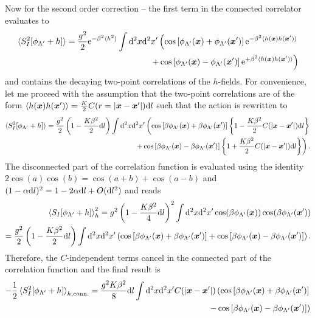 Now for the second order correction -- the first term in the connected correlator evaluates to
\begin{align}
    \braket{S^2_I[\phi_{\Lambda'}+h]}=\frac{g^2}2\mathrm e^{-\beta^2\braket{h^2}}\int\mathrm d^2x\mathrm d^2x'
    \left(
        \cos\left[ \phi_{\Lambda'}({\bm x})+\phi_{\Lambda'}({\bm x'}) \right]\mathrm e^{-\beta^2\braket{h({\bm x})h({\bm x'})}}
        \right.\\
        \left.+
        \cos\left[ \phi_{\Lambda'}({\bm x})-\phi_{\Lambda'}({\bm x'}) \right]\mathrm e^{+\beta^2\braket{h({\bm x})h({\bm x'})}}
    \right)
    \label{eq:second_order_rg_term1}
\end{align}
and contains the decaying two-point correlations of the $h$-fields.
For convenience, let me proceed with the assumption that the two-point correlations are of the form $\braket{h({\bm x})h({\bm x'})} = \frac K2 C(r=|{\bm x}-{\bm x'}|)\mathrm d l$ such that the action is rewritten to
{\small
\begin{align}
    \braket{S^2_I[\phi_{\Lambda'}+h]}=\frac{g^2}2\left( 1 - \frac{K\beta^2}2\mathrm d l \right)\int\mathrm d^2x\mathrm d^2x'
    \left(
        \cos\left[ \beta\phi_{\Lambda'}({\bm x})+\beta\phi_{\Lambda'}({\bm x'}) \right]\left\{ 1-\frac{K\beta^2}2C(|{\bm x}-{\bm x'}|)\mathrm d l \right\}
        \right.\\
        \left.+
        \cos\left[ \beta\phi_{\Lambda'}({\bm x})-\beta\phi_{\Lambda'}({\bm x'}) \right]\left\{ 1+\frac{K\beta^2}2C(|{\bm x}-{\bm x'}|)\mathrm d l \right\}
    \right).
\end{align}
}%
The disconnected part of the correlation function is evaluated using the identity $2\cos(a)\cos(b)=\cos(a+b)+\cos(a-b)$ and $(1-\alpha\mathrm d l)^2 = 1-2\alpha\mathrm d l + O(\mathrm d l^2)$ and reads
\begin{align}
    \braket{S_I[\phi_{\Lambda'}+h]}_h^2
    = g^2\left( 1 - \frac{K\beta^2}4\mathrm d l \right)^2\int\mathrm d^2x\mathrm d^2x'\cos(\beta \phi_{\Lambda'}({\bm x}))\cos(\beta \phi_{\Lambda'}({\bm x'}))
    \\
    = \frac{g^2}2\left( 1 - \frac{K\beta^2}2\mathrm d l \right)\int\mathrm d^2x\mathrm d^2x'
        \left(
            \cos\left[ \beta \phi_{\Lambda'}({\bm x})+\beta \phi_{\Lambda'}({\bm x'}) \right]
            +
            \cos\left[ \beta \phi_{\Lambda'}({\bm x})-\beta \phi_{\Lambda'}({\bm x'}) \right]
        \right).
\end{align}
Therefore, the $C$-independent terms cancel in the connected part of the correlation function and the final result is
\begin{align}
    -\frac12\braket{S^2_I[\phi_{\Lambda'}+h]}_{h,{\rm conn.}} = \frac{g^2K\beta^2}8\mathrm d l\int\mathrm d^2x\mathrm d^2x'
    C(|{\bm x}-{\bm x'}|)
    \left(
        \cos\left[ \beta\phi_{\Lambda'}({\bm x})+\beta\phi_{\Lambda'}({\bm x'}) \right]
        \right.
        \\
        \left.-
        \cos\left[ \beta\phi_{\Lambda'}({\bm x})-\beta\phi_{\Lambda'}({\bm x'}) \right]
    \right)
\end{align}
